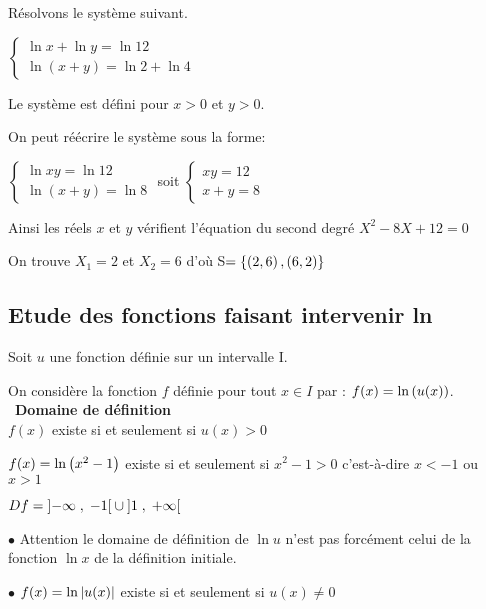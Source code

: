 \begin{example}
Résolvons le système suivant.

\medskip

$  \left\{\begin{array}{l} \ln x+\ln y=\ln 12  \\ \ln (x+y)=\ln 2+\ln 4 \end{array}\right.$

Le système est défini pour $x>0 $ et $y>0 $.

\medskip
On peut réécrire le système  sous la forme:
\medskip

$  \left\{\begin{array}{l} \ln xy=\ln 12  \\ \ln (x+y)=\ln 8 \end{array}\right.$
\quad soit   $  \left\{\begin{array}{l} xy=12 \\ x+y=8\end{array}\right.$

\medskip

Ainsi les réels $x $ et $y $ vérifient l'équation du second degré \; $ X^{2}-8X+12=0 $
\bigskip


On trouve $X_{1}=2  $  et $X_{2}=6$ \;d'où \;S$ =\left\{\left(2,6\right),\left(6,2\right)\right\} $

\end{example}
\subsection{ Etude des fonctions faisant intervenir ln }
Soit $ u $ une fonction définie sur un intervalle I.

On considère la fonction $ f $ définie pour tout $ x\in I $ par : \; $ f(x)=\ln \left(u(x)\right) $.\\\
\textbf{Domaine de définition}\\
$ f(x)  $ existe  si et seulement si $ u(x)>0 $
\begin{example}

$ f(x)=\ln \left(x^{2}-1\right) $  existe  si et seulement si $ x^{2}-1>0 $ c'est-à-dire $ x<-1$ ou $ x>1 $


\medskip
$ Df=\left]-\infty \;,\; -1\right[\cup\left]1 \;,\; +\infty\right[ $
\end{example}
\begin{remark}

$ \bullet $  Attention le domaine de définition de $ \ln u $  n'est pas  forcément celui de la fonction $ \ln x  $  de la définition initiale.

$ \bullet $\; $ f(x)=\ln \left\lvert u(x) \right\rvert $  existe  si et seulement si $ u(x)\neq 0 $
\end{remark}

